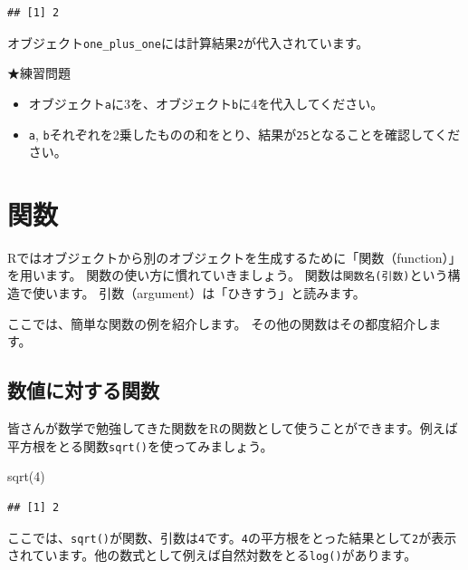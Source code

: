 \documentclass[
]{book}
\newenvironment{Shaded}{\begin{snugshade}}{\end{snugshade}}
\newcommand{\DecValTok}[1]{\textcolor[rgb]{0.00,0.00,0.81}{#1}}
\newcommand{\FunctionTok}[1]{\textcolor[rgb]{0.00,0.00,0.00}{#1}}
\newcommand{\NormalTok}[1]{#1}
\providecommand{\tightlist}{%
  \setlength{\itemsep}{0pt}\setlength{\parskip}{0pt}}
\begin{document}
\begin{verbatim}
## [1] 2
\end{verbatim}

オブジェクト\texttt{one\_plus\_one}には計算結果\texttt{2}が代入されています。

★練習問題

\begin{itemize}
\tightlist
\item
  オブジェクト\texttt{a}に3を、オブジェクト\texttt{b}に4を代入してください。
\item
  \texttt{a}, \texttt{b}それぞれを2乗したものの和をとり、結果が\texttt{25}となることを確認してください。
\end{itemize}

\hypertarget{ux95a2ux6570}{%
\section{関数}\label{ux95a2ux6570}}

Rではオブジェクトから別のオブジェクトを生成するために「関数（function）」を用います。
関数の使い方に慣れていきましょう。
関数は\texttt{関数名(引数)}という構造で使います。
引数（argument）は「ひきすう」と読みます。

ここでは、簡単な関数の例を紹介します。
その他の関数はその都度紹介します。

\hypertarget{ux6570ux5024ux306bux5bfeux3059ux308bux95a2ux6570}{%
\subsection{数値に対する関数}\label{ux6570ux5024ux306bux5bfeux3059ux308bux95a2ux6570}}

皆さんが数学で勉強してきた関数をRの関数として使うことができます。例えば平方根をとる関数\texttt{sqrt()}を使ってみましょう。

\begin{Shaded}
\begin{Highlighting}[]
\FunctionTok{sqrt}\NormalTok{(}\DecValTok{4}\NormalTok{)}
\end{Highlighting}
\end{Shaded}

\begin{verbatim}
## [1] 2
\end{verbatim}

ここでは、\texttt{sqrt()}が関数、引数は\texttt{4}です。\texttt{4}の平方根をとった結果として\texttt{2}が表示されています。他の数式として例えば自然対数をとる\texttt{log()}があります。
\end{document}
